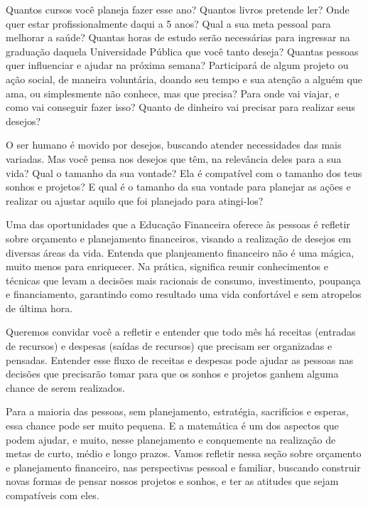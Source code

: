Quantos cursos você planeja fazer esse ano? Quantos livros pretende ler? Onde quer estar profissionalmente daqui a 5 anos? Qual a sua meta pessoal para melhorar a saúde? Quantas horas de estudo serão necessárias para ingressar na graduação daquela Universidade Pública que você tanto deseja? Quantas pessoas quer influenciar e ajudar na próxima semana? Participará de algum projeto ou ação social, de maneira voluntária, doando seu tempo e sua atenção a alguém que ama, ou simplesmente não conhece, mas que precisa? Para onde vai viajar, e como vai conseguir fazer isso? Quanto de dinheiro vai precisar para realizar seus desejos? 

O ser humano é movido por desejos, buscando atender necessidades das mais variadas. Mas você pensa nos desejos que têm, na relevância deles para a sua vida? Qual o tamanho da sua vontade? Ela é compatível com o tamanho dos teus sonhos e projetos? E qual é o tamanho da sua vontade para planejar as ações e realizar ou ajustar aquilo que foi planejado para atingi-los? 

Uma das oportunidades que a Educação Financeira oferece às pessoas é refletir sobre orçamento e planejamento financeiros, visando a realização de desejos em diversas áreas da vida. Entenda que planjeamento financeiro não é uma mágica, muito menos para enriquecer. Na prática, significa reunir conhecimentos e técnicas que levam a decisões mais racionais de consumo, investimento, poupança e financiamento, garantindo como resultado uma vida confortável e sem atropelos de última hora.

Queremos convidar você a refletir e entender que todo mês há receitas (entradas de recursos) e despesas (saídas de recursos) que precisam ser organizadas e pensadas. Entender esse fluxo de receitas e despesas pode ajudar as pessoas nas decisões que precisarão tomar para que os sonhos e projetos ganhem alguma chance de serem realizados. 

Para a maioria das pessoas, sem planejamento, estratégia, sacrifícios e esperas, essa chance pode ser muito pequena. E a matemática é um dos aspectos que podem ajudar, e muito, nesse planejamento e conquemente na realização de metas de curto, médio e longo prazos. Vamos refletir nessa seção sobre orçamento e planejamento financeiro, nas perspectivas pessoal e familiar, buscando construir novas formas de pensar nossos projetos e sonhos, e ter as atitudes que sejam compatíveis com eles.
\clearpage

